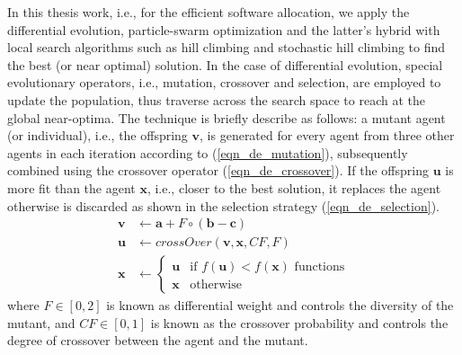 In this thesis work, i.e., for the efficient software allocation, we apply the differential evolution, particle-swarm optimization and the latter's hybrid with local search algorithms such as hill climbing and stochastic hill climbing to find the best (or near optimal) solution. In the case of differential evolution, special evolutionary operators, i.e., mutation, crossover and selection, are employed to update the population, thus traverse across the search space to reach at the global near-optima. The technique is briefly describe as follows: a mutant agent (or individual), i.e., the offspring $\textbf{v}$, is generated for every agent from three other agents in each iteration according to (\ref{eqn_de_mutation}), subsequently combined using the crossover operator (\ref{eqn_de_crossover}). If the offspring $\textbf{u}$ is more fit than the agent $\textbf{x}$, i.e., closer to the best solution, it replaces the agent otherwise is discarded as shown in the selection strategy (\ref{eqn_de_selection}).
\begin{align}
\label{eqn_de_mutation}
\textbf{v} & \leftarrow   \textbf{a} + F\circ(\textbf{b}-\textbf{c})\\
\label{eqn_de_crossover}
\textbf{u}&\leftarrow crossOver(\textbf{v},\textbf{x},CF,F)\\
\label{eqn_de_selection}
\textbf{x} &\leftarrow 
\begin{cases}
	\textbf{u} & \mbox{if } f(\textbf{u}) < f(\textbf{x})\mbox{ functions}\\
	\textbf{x} & \mbox{otherwise }
\end{cases}
\end{align}
where $F\in[0,2]$ is known as differential weight and controls the diversity of the mutant, and $CF\in[0,1]$ is known as the crossover probability and controls the degree of crossover between the agent and the mutant.

